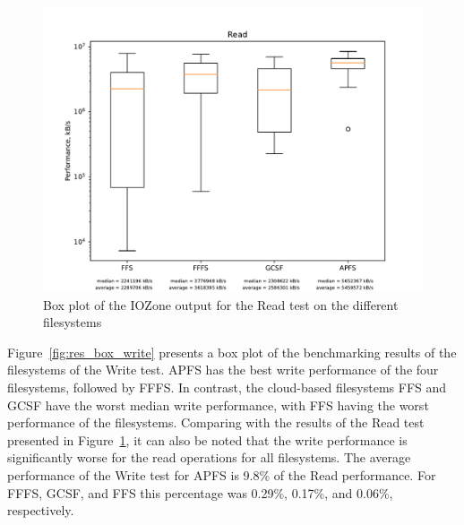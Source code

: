 \begin{figure}[!ht]
	\label{fig:res_box_read}
	\begin{center}
		\includegraphics[width=1.0\textwidth]{figures/benchmarking/Read_box.pdf}
	\end{center}
	\caption{Box plot of the IOZone output for the Read test on the different filesystems}
\end{figure}

\FloatBarrier

Figure~\ref{fig:res_box_write} presents a box plot of the benchmarking results of the filesystems of the Write test. \gls{APFS} has the best write performance of the four filesystems, followed by \gls{FFFS}. In contrast, the cloud-based filesystems \gls{FFS} and \gls{GCSF} have the worst median write performance, with \gls{FFS} having the worst performance of the filesystems. Comparing with the results of the Read test presented in Figure~\ref{fig:res_box_read}, it can also be noted that the write performance is significantly worse for the read operations for all filesystems. The average performance of the Write test for \gls{APFS} is 9.8\% of the Read performance. For \gls{FFFS}, \gls{GCSF}, and \gls{FFS} this percentage was 0.29\%, 0.17\%, and 0.06\%, respectively.

